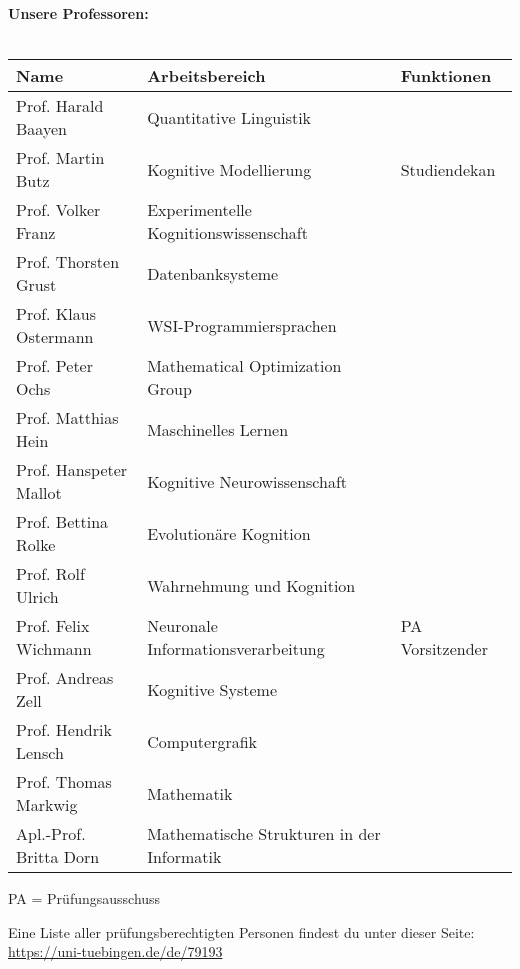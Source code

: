 \renewcommand{\arraystretch}{1}
\normalsize 
\textbf{Unsere Professoren:}\\\\
\footnotesize

\begin{tabular}{|p{}p{}p{}|}
\hline
Name                        & Arbeitsbereich                        & Funktionen \\
\hline
\hline
Prof. Harald Baayen			    & Quantitative Linguistik 				      & \\
Prof. Martin Butz           & Kognitive Modellierung 				        & Studiendekan	\\
Prof. Volker Franz			    & Experimentelle Kognitionswissenschaft	& \\
Prof. Thorsten Grust		    & Datenbanksysteme                      & \\
Prof. Klaus Ostermann       & WSI-Programmiersprachen               & \\
Prof. Peter Ochs            & Mathematical Optimization Group       & \\
Prof. Matthias Hein			    & Maschinelles Lernen                   & \\
Prof. Hanspeter Mallot 		  & Kognitive Neurowissenschaft	          & \\
Prof. Bettina Rolke			    & Evolutionäre Kognition	              & \\
Prof. Rolf Ulrich			      & Wahrnehmung und Kognition	            & \\
Prof. Felix Wichmann        & Neuronale Informationsverarbeitung	  & PA Vorsitzender\\
Prof. Andreas Zell          & Kognitive Systeme 		                & \\
Prof. Hendrik Lensch        & Computergrafik                        & \\
Prof. Thomas Markwig        & Mathematik                            & \\
Apl.-Prof. Britta Dorn      & Mathematische Strukturen in der Informatik &\\
\hline
\end{tabular}

\scriptsize{PA = Prüfungsausschuss}

Eine Liste aller prüfungsberechtigten Personen findest du unter dieser Seite: \url{https://uni-tuebingen.de/de/79193}

